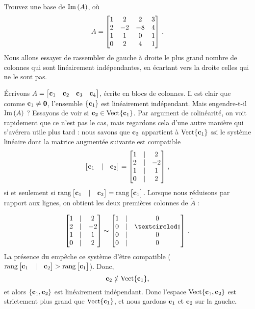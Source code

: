 \begin{myprob} \label{colspaceexample} Trouvez une base de $\im(A)$, où 
$$A = \mat{
1&2&2&3\\2&-2&-8&4\\1&1&0&1\\0&2&4&1}\,.
$$
Nous allons essayer de rassembler de gauche à droite le plus grand nombre de colonnes qui sont linéairement indépendantes, en écartant vers la droite celles qui ne le sont pas.

Écrivons $A= \mat{\cc_1&\cc_2&\cc_3&\cc_4}$, écrite en blocs de colonnes. Il est clair que comme $\cc_1\not=\zero$, l'ensemble $\set{\cc_1}$ est linéairement indépendant. Mais engendre-t-il $\im(A)$ ? Essayons de voir si $\cc_2\in \sp{\cc_1}$. Par argument de colinéarité, on voit rapidement que ce n'est pas le cas, mais regardons cela d'une autre manière qui s'avérera utile plus tard :
nous savons que $\cc_2$ appartient à $\sp{\cc_1}$ ssi le système linéaire dont la matrice augmentée suivante est compatible
$$ \mat{\cc_1&|&\cc_2}=
\mat{
1&|&2\\
2&|&-2\\
1&|&1\\
0&|&2}\,,$$
si et seulement si $\rank\mat{\cc_1&|&\cc_2}=\rank\mat{\cc_1}$. Lorsque nous réduisons par rapport aux lignes, on obtient les deux premières colonnes de $\tilde A$ :

$$\mat{
1&|&2\\
2&|&-2\\
1&|&1\\
0&|&2}  \sim \mat{1 &|&0\\ 0 &|& \pivot\\ 0 &|& 0 \\ 0 &|& 0 }\,.$$
La présence du  empêche ce système d'être compatible ($\rank\mat{\cc_1&|&\cc_2}>\rank\mat{\cc_1}$). Donc, $$\cc_2\notin \sp{\cc_1},$$ et alors $\set{\cc_1, \cc_2}$ est linéairement indépendant. Donc l'espace $\sp{\cc_1, \cc_2}$ est strictement plus grand que $\sp{\cc_1}$, et nous gardons $\cc_1$ et $\cc_2$ sur la gauche.


\end{myprob}
